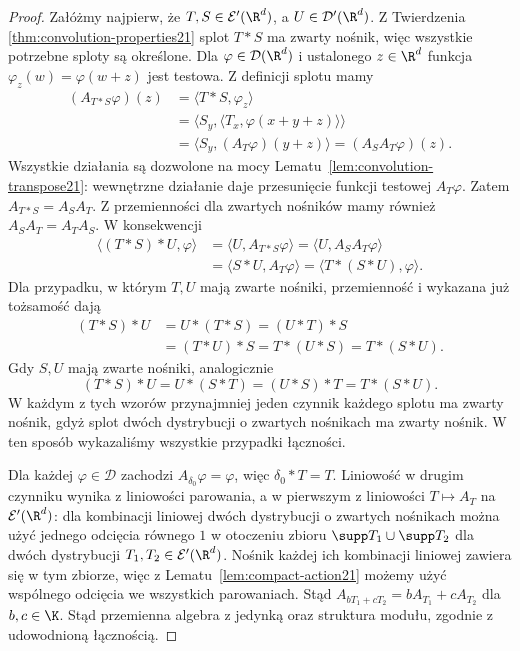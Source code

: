 \begin{proof}
Załóżmy najpierw, że $T,S\in\mathcal E'(\R^d)$,
a $U\in\mathcal D'(\R^d)$. Z Twierdzenia~
\ref{thm:convolution-properties21} splot $T*S$ ma zwarty
nośnik, więc wszystkie potrzebne sploty są określone.
Dla $\varphi\in\mathcal D(\R^d)$ i ustalonego $z\in\R^d$
funkcja $\varphi_z(w)=\varphi(w+z)$ jest testowa.
Z definicji splotu mamy
\[
\begin{aligned}
 (A_{T*S}\varphi)(z)
 &=\langle T*S,\varphi_z\rangle\\
 &=\langle S_y,\langle T_x,\varphi(x+y+z)\rangle\rangle\\
 &=\langle S_y,(A_T\varphi)(y+z)\rangle
 =(A_S A_T\varphi)(z).
\end{aligned}
\]
Wszystkie działania są dozwolone na mocy
Lematu~\ref{lem:convolution-transpose21}: wewnętrzne
działanie daje przesunięcie funkcji testowej $A_T\varphi$.
Zatem $A_{T*S}=A_S A_T$. Z przemienności dla zwartych
nośników mamy również $A_S A_T=A_T A_S$.
W konsekwencji
\[
\begin{aligned}
 \langle (T*S)*U,\varphi\rangle
 &=\langle U,A_{T*S}\varphi\rangle
 =\langle U,A_S A_T\varphi\rangle\\
 &=\langle S*U,A_T\varphi\rangle
 =\langle T*(S*U),\varphi\rangle .
\end{aligned}
\]
Dla przypadku, w którym $T,U$ mają zwarte nośniki,
przemienność i wykazana już tożsamość dają
\[
\begin{aligned}
 (T*S)*U&=U*(T*S)=(U*T)*S\\
 &=(T*U)*S=T*(U*S)=T*(S*U).
\end{aligned}
\]
Gdy $S,U$ mają zwarte nośniki, analogicznie
\[
 (T*S)*U=U*(S*T)=(U*S)*T=T*(S*U).
\]
W każdym z tych wzorów przynajmniej jeden czynnik
każdego splotu ma zwarty nośnik, gdyż splot dwóch
dystrybucji o zwartych nośnikach ma zwarty nośnik.
W ten sposób wykazaliśmy wszystkie przypadki łączności.

Dla każdej $\varphi\in\mathcal D$ zachodzi
$A_{\delta_0}\varphi=\varphi$, więc $\delta_0*T=T$.
Liniowość w drugim czynniku wynika z liniowości
parowania, a w pierwszym z liniowości
$T\mapsto A_T$ na $\mathcal E'(\R^d)$: dla kombinacji
liniowej dwóch dystrybucji o zwartych nośnikach można
użyć jednego odcięcia równego $1$ w otoczeniu zbioru
$\supp T_1\cup\supp T_2$ dla dwóch dystrybucji
$T_1,T_2\in\mathcal E'(\R^d)$.
Nośnik każdej ich kombinacji liniowej zawiera się
w tym zbiorze, więc z Lematu~\ref{lem:compact-action21}
możemy użyć wspólnego odcięcia we wszystkich parowaniach.
Stąd $A_{bT_1+cT_2}=bA_{T_1}+cA_{T_2}$ dla $b,c\in\K$.
Stąd przemienna algebra z jedynką oraz struktura
modułu, zgodnie z udowodnioną łącznością.
\end{proof}

